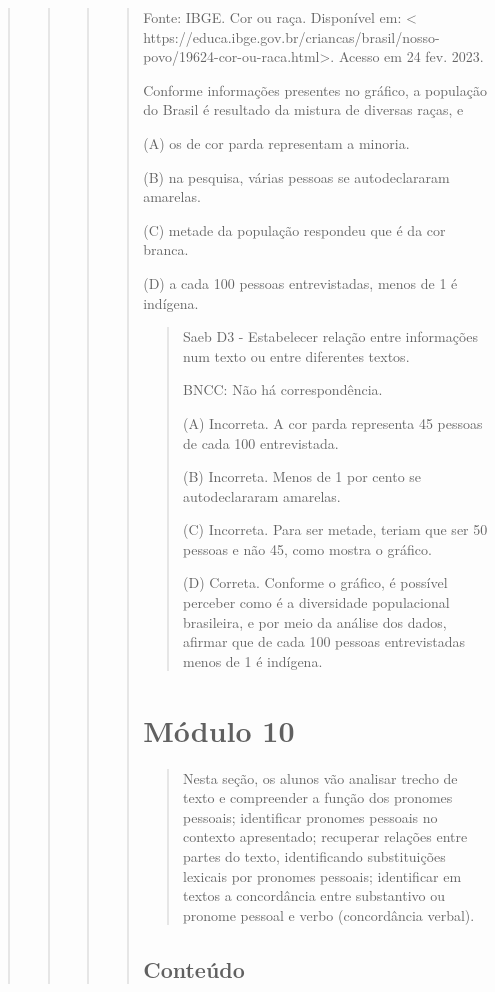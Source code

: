 \begin{quote}
\begin{quote}
\begin{quote}
\begin{quote}
\protect\hypertarget{_Hlk40547643}{}{}

Fonte: IBGE. Cor ou raça. Disponível em: \textless{}
https://educa.ibge.gov.br/criancas/brasil/nosso-povo/19624-cor-ou-raca.html\textgreater{}.
Acesso em 24 fev. 2023.

Conforme informações presentes no gráfico, a população do Brasil é
resultado da mistura de diversas raças, e

(A) os de cor parda representam a minoria.

(B) na pesquisa, várias pessoas se autodeclararam amarelas.

(C) metade da população respondeu que é da cor branca.

(D) a cada 100 pessoas entrevistadas, menos de 1 é indígena.

\begin{quote}
Saeb D3 - Estabelecer relação entre informações num texto ou entre
diferentes textos.

BNCC: Não há correspondência.

(A) Incorreta. A cor parda representa 45 pessoas de cada 100
entrevistada.

(B) Incorreta. Menos de 1 por cento se autodeclararam amarelas.

(C) Incorreta. Para ser metade, teriam que ser 50 pessoas e não 45, como
mostra o gráfico.

(D) Correta. Conforme o gráfico, é possível perceber como é a
diversidade populacional brasileira, e por meio da análise dos dados,
afirmar que de cada 100 pessoas entrevistadas menos de 1 é indígena.
\end{quote}

\section{Módulo 10}\label{muxf3dulo-10}

\begin{quote}
Nesta seção, os alunos vão analisar trecho de texto e compreender a
função dos pronomes pessoais; identificar pronomes pessoais no contexto
apresentado; recuperar relações entre partes do texto, identificando
substituições lexicais por pronomes pessoais; identificar em textos a
concordância entre substantivo ou pronome pessoal e verbo (concordância
verbal).
\end{quote}

\subsection{Conteúdo}\label{conteuxfado-9}


\end{quote}
\end{quote}
\end{quote}
\end{quote}
